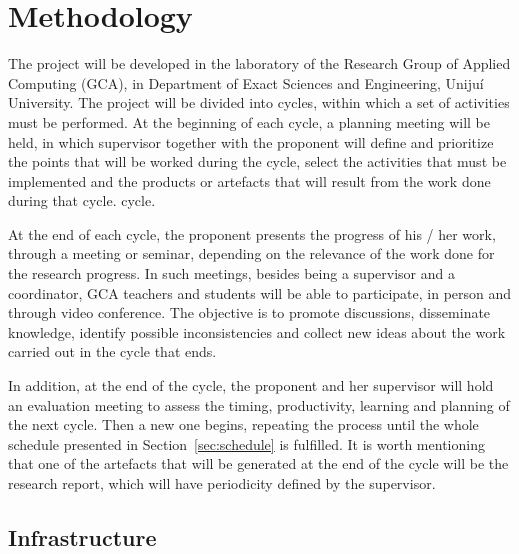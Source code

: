 \section{Methodology}
\label{sec:methodology}

\noindent 

The project will be developed in the laboratory of the Research Group of Applied Computing (GCA), in Department of Exact Sciences and Engineering, Uniju\'{i} University.
The project will be divided into cycles, within which a set of activities must be performed. At the beginning of each cycle, a planning meeting will be held, in which supervisor together with the proponent will define and prioritize the points that will be worked during the cycle, select the activities that must be implemented and the products or artefacts that will result from the work done during that cycle. cycle.

At the end of each cycle, the proponent presents the progress of his / her work, through a meeting or seminar, depending on the relevance of the work done for the research progress. In such meetings, besides being a supervisor and a coordinator, GCA teachers and students will be able to participate, in person and through video conference. The objective is to promote discussions, disseminate knowledge, identify possible inconsistencies and collect new ideas about the work carried out in the cycle that ends.

In addition, at the end of the cycle, the proponent and her supervisor will hold an evaluation meeting to assess the timing, productivity, learning and planning of the next cycle.
Then a new one begins, repeating the process until the whole schedule presented in Section~\ref{sec:schedule} is fulfilled.
It is worth mentioning that one of the artefacts that will be generated at the end of the cycle will be the research report, which will have periodicity defined by the supervisor.

\subsection{Infrastructure}
\label{subsec:infrastructure}
